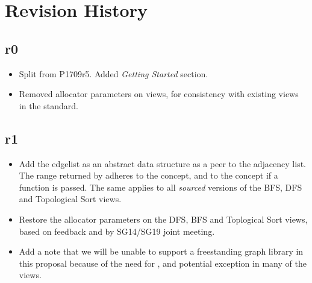 \section{Revision History}

\subsection*{\paperno r0}

\begin{itemize}
      \item Split from P1709r5. Added \textit{Getting Started} section.
      \item Removed allocator parameters on views, for consistency with existing views in the standard. 
\end{itemize}

\subsection*{\paperno r1}
\begin{itemize}
      \item Add the edgelist as an abstract data structure as a peer to the adjacency list. 
            The range returned by  adheres to the  concept,
            and to the  concept if a  function is passed. The same applies to
            all \textit{sourced} versions of the BFS, DFS and Topological Sort views.
      \item Restore the allocator parameters on the DFS, BFS and Toplogical Sort views, based on feedback and 
            by SG14/SG19 joint meeting.
      \item Add a note that we will be unable to support a freestanding graph library in this proposal because
            of the need for ,  and potential  exception in many of 
            the views.
\end{itemize}
